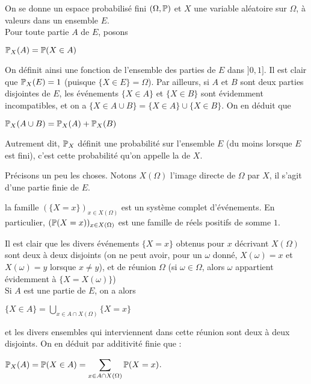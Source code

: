 \documentclass[12pt,a4paper]{report}
\begin{document}
\begin{remarque}{}
On se donne un espace probabilisé fini $(\Omega,\mathbb{P})$ et $X$ une variable aléatoire sur $\Omega$, à valeurs dans un ensemble $E$. \\

Pour toute partie $A$ de $E$, posons 
\begin{center}
$\mathbb{P}_X(A) = \mathbb{P}(X \in A)$
\end{center}

On définit ainsi une fonction de l'ensemble des parties de $E$ dans $]0,1]$. Il est clair que $\mathbb{P}_X(E) = 1$ (puisque $\{X \in E\} = \Omega$). Par ailleurs, si $A$ et $B$ sont deux parties disjointes de $E$, les événements $\{X \in A\}$ et $\{X \in B\}$ sont évidemment incompatibles, et on a $\{X \in A \cup B\} = \{X \in A \} \cup \{X \in B\}$. On en déduit que
\begin{center}
$\mathbb{P}_X(A \cup B) = \mathbb{P}_X(A) + \mathbb{P}_X(B)$
\end{center}

\begin{definition}{}{}
Autrement dit, $\mathbb{P}_X$ définit une probabilité sur l'ensemble $E$ (du moins lorsque $E$ est fini), c'est cette probabilité qu'on appelle la  de $X$.
\end{definition}

Précisons un peu les choses. Notons $X(\Omega)$ l'image directe de $\Omega$ par $X$, il s'agit d'une partie finie de $E$.

\begin{proposition}{}{}
la famille $(\{X=x\})_{x \in X(\Omega)}$ est un système complet d'événements. En particulier, $(\mathbb{P}(X = x))_{x \in X(\Omega)}$ est une famille de réels positifs de somme $1$.
\end{proposition}

\begin{demo}{}
Il est clair que les divers événements $\{X = x \}$ obtenus pour $x$ décrivant $X(\Omega)$ sont deux à deux disjoints (on ne peut avoir, pour un $\omega$ donné, $X(\omega) = x$ et $X(\omega) = y$ lorsque $x \ne y$), et de réunion $\Omega$ (si $\omega \in \Omega$, alors $\omega$ appartient évidemment à $\{X = X(\omega)\}$) \\

Si $A$ est une partie de $E$, on a alors 
\begin{center}
$\{X \in A \} = \displaystyle \bigcup_{x \in A \cap X(\Omega)} \{X=x\}$
\end{center}
et les divers ensembles qui interviennent dans cette réunion sont deux à deux disjoints. On en déduit par additivité finie que :
\begin{center}
$\mathbb{P}_X(A) = \mathbb{P}(X \in A) = \displaystyle \sum_{x \in A \cap X(\Omega)} \mathbb{P}(X=x)$.
\end{center}


\end{demo}
\end{remarque}
\end{document}
